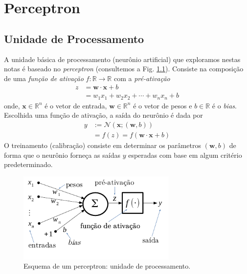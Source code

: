
\chapter{Perceptron}\label{cap_perceptron}
\thispagestyle{fancy}


\section{Unidade de Processamento}

A unidade básica de processamento (neurônio artificial) que exploramos nestas notas é baseado no \emph{perceptron} (consultemos a Fig. \ref{fig:perceptron}). Consiste na composição de uma \emph{função de ativação} $f:\mathbb{R}\to\mathbb{R}$ com a \emph{pré-ativação}
\begin{align}
  z &= \pmb{w}\cdot\pmb{x} + b\\
    &= w_1x_1 + w_2x_2 + \cdots + w_nx_n + b
\end{align}
onde, $\pmb{x}\in\mathbb{R}^{n}$ é o vetor de entrada, $\pmb{w}\in\mathbb{R}^{n}$ é o vetor de pesos e $b\in\mathbb{R}$ é o {\it bias}. Escolhida uma função de ativação, a saída do neurônio é dada por
\begin{align}
  y &:= \mathcal{N}\left(\pmb{x};(\pmb{w},b)\right)\\
    &= f(z) = f(\pmb{w}\cdot\pmb{x} + b)
\end{align}
O treinamento (calibração) consiste em determinar os parâmetros $(\pmb{w}, b)$ de forma que o neurônio forneça as saídas $y$ esperadas com base em algum critério predeterminado.

\begin{figure}[H]
  \centering
  \includegraphics[width=0.7\textwidth]{./cap_perceptron/dados/fig_perceptron/fig}
  \caption{Esquema de um perceptron: unidade de processamento.}
  \label{fig:perceptron}
\end{figure}

